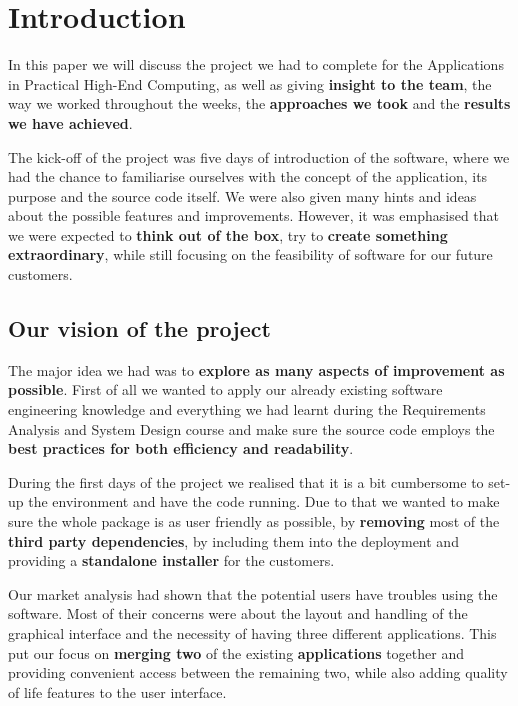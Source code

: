 \documentclass[a4paper, 11pt, article]{report}
\begin{document}

\tableofcontents
\newpage

\chapter{Introduction}

In this paper we will discuss the project we had to complete for the Applications in Practical High-End Computing, as well as giving \textbf{insight to the team}, the way we worked throughout the weeks, the \textbf{approaches we took} and the \textbf{results we have achieved}.

The kick-off of the project was five days of introduction of the software, where we had the chance to familiarise ourselves with the concept of the application, its purpose and the source code itself. We were also given many hints and ideas about the possible features and improvements. However, it was emphasised that we were expected to \textbf{think out of the box}, try to \textbf{create something extraordinary}, while still focusing on the feasibility of software for our future customers.

\section{Our vision of the project}

The major idea we had was to \textbf{explore as many aspects of improvement as possible}. First of all we wanted to apply our already existing software engineering knowledge and everything we had learnt during the Requirements Analysis and System Design course and make sure the source code employs the \textbf{best practices for both efficiency and readability}.

During the first days of the project we realised that it is a bit cumbersome to set-up the environment and have the code running. Due to that we wanted to make sure the whole package is as user friendly as possible, by \textbf{removing} most of the \textbf{third party dependencies}, by including them into the deployment and providing a \textbf{standalone installer} for the customers.

Our market analysis had shown that the potential users have troubles using the software. Most of their concerns were about the layout and handling of the graphical interface and the necessity of having three different applications. This put our focus on \textbf{merging two} of the existing \textbf{applications} together and providing convenient access between the remaining two, while also adding  quality of life features to the user interface.
\end{document}
